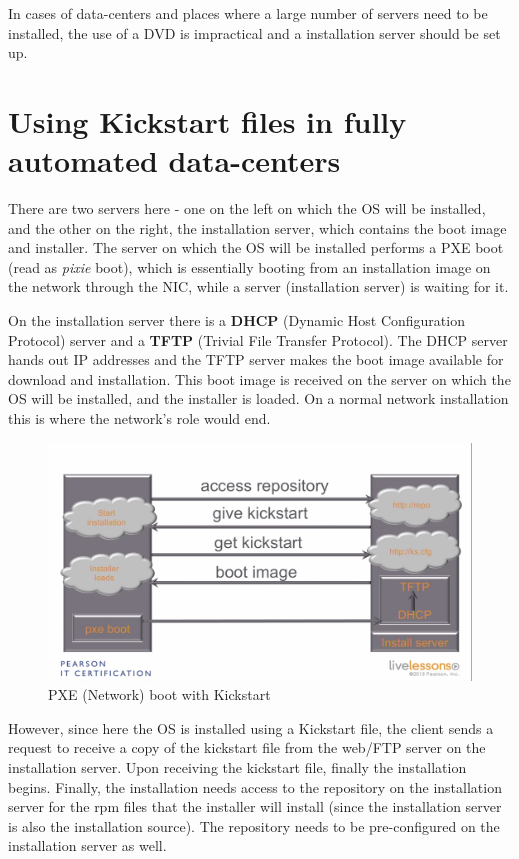 In cases of data-centers and places where a large number of servers need to be installed, the use of a DVD is impractical and a installation server should be set up. 

	\section{Using Kickstart files in fully automated data-centers}
There are two servers here - one on the left on which the OS will be installed, and the other on the right, the installation server, which contains the boot image and installer. The server on which the OS will be installed performs a PXE boot (read as \textit{pixie} boot), which is essentially booting from an installation image on the network through the NIC, while a server (installation server) is waiting for it. 

On the installation server there is a \textbf{DHCP} (Dynamic Host Configuration Protocol) server and a \textbf{TFTP} (Trivial File Transfer Protocol). The DHCP server hands out IP addresses and the TFTP server makes the boot image available for download and installation. This boot image is received on the server on which the OS will be installed, and the installer is loaded. On a normal network installation this is where the network's role would end.

\begin{figure}[H]
	\centering
	\includegraphics[width=0.9\linewidth]{Mod3/chapters/3.18.a}
	\caption{PXE (Network) boot with Kickstart}
	\label{fig:3 Network boot with Kickstart}
\end{figure}

\noindent
However, since here the OS is installed using a Kickstart file, the client sends a request to receive a copy of the kickstart file from the web/FTP server on the installation server. Upon receiving the kickstart file, finally the installation begins. Finally, the installation needs access to the repository on the installation server for the rpm files that the installer will install (since the installation server is also the installation source). The repository needs to be pre-configured on the installation server as well. 